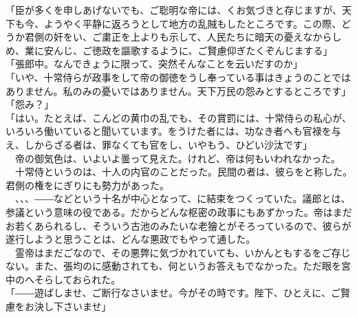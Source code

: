 \documentclass[
  paper=a5,
  fontsize=10pt,
  jafontsize=9.5pt,
  tate,                  %
  open_bracket_pos=nibu, %
]{jlreq}
\begin{document}
「臣が多くを申しあげないでも、ご聡明な帝には、くお気づきと存じますが、天下も今、ようやく平静に返ろうとして地方の乱賊もしたところです。この際、どうか君側の奸をい、ご粛正を上よりも示して、人民たちに暗天の憂えなからしめ、業に安んじ、ご徳政を謳歌するように、ご賢慮仰ぎたくぞんじまする」\\


「張郎中。なんできょうに限って、突然そんなことを云いだすのか」\\


「いや、十常侍らが政事をして帝の御徳をうし奉っている事はきょうのことではありません。私のみの憂いではありません。天下万民の怨みとするところです」\\


「怨み？」\\


「はい。たとえば、こんどの黄巾の乱でも、その賞罰には、十常侍らの私心が、いろいろ働いていると聞いています。をうけた者には、功なき者へも官禄を与え、しからざる者は、罪なくても官をし、いやもう、ひどい沙汰です」\\


　帝の御気色は、いよいよ曇って見えた。けれど、帝は何もいわれなかった。\\


　十常侍というのは、十人の内官のことだった。民間の者は、彼らをと称した。君側の権をにぎりにも勢力があった。\\


　、、、――などという十名が中心となって、に結束をつくっていた。議郎とは、参議という意味の役である。だからどんな枢密の政事にもあずかった。帝はまだお若くあられるし、そういう古池のみたいな老獪とがそろっているので、彼らが遂行しようと思うことは、どんな悪政でもやって通した。\\


　霊帝はまだごなので、その悪弊に気づかれていても、いかんともするをご存じない。また、張均のに感動されても、何というお答えもでなかった。ただ眼を宮中のへそらしておられた。\\


「――遊ばしませ、ご断行なさいませ。今がその時です。陛下、ひとえに、ご賢慮をお決し下さいませ」\\
\end{document}
